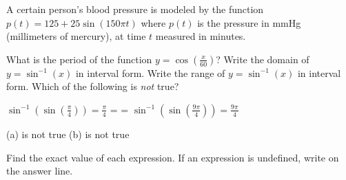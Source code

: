 \documentclass[11pt,answers]{exam}
\makeatletter
\newcommand{\inlineitem}[1][]{%
\ifnum\enit@type=\tw@
    {\descriptionlabel{#1}}
  \hspace{\labelsep}%
\else
  \ifnum\enit@type=\z@
       \refstepcounter{\@listctr}\fi
    \quad\@itemlabel\hspace{\labelsep}%
\fi}
\makeatother
\begin{document}
\begin{questions}
A certain person's blood pressure is modeled by the function
$\displaystyle p(t) = 125 + 25 \sin(150\pi t)$
where $p(t)$ is the pressure in mmHg (millimeters of mercury), at time $t$ measured in minutes.


\newpage
\bonusquestion[1] What is the period of the function $\displaystyle y=\cos\left (\frac{x}{60}\right )$? \dotfill
\question[2] Write the domain of $\displaystyle y=\sin^{-1}(x)$ in interval form. \dotfill
\question[2] Write the range of $\displaystyle y=\sin^{-1}(x)$ in interval form. \dotfill
\question[1] Which of the following is {\emph{not}} true?
\begin{enumerate*}[label=\textcolor{red}{\bf (\alph*)}]
\item $\displaystyle \sin^{-1}\left (\sin \left(\frac{\pi}{4}\right )\right )=\frac{\pi}{4}$
\inlineitem $\displaystyle \sin^{-1}\left (\sin \left(\frac{9\pi}{4}\right )\right )=\frac{9\pi}{4}$
\end{enumerate*}
\begin{oneparchoices}
\choice (a) is not true
\choice (b) is not true   
\end{oneparchoices}
\question Find the exact value of each expression. If an expression is undefined, write {} on the answer line.
\end{questions}
\end{document}
